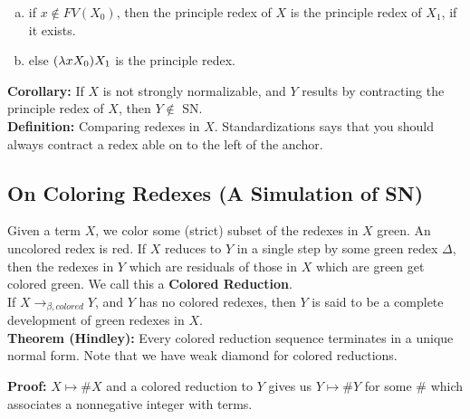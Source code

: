 \begin{enumerate}[a.]
  \item if $x \not\in FV(X_0)$, then the principle redex of $X$ is the principle redex of $X_1$, if it exists.
  \item else $(\lambda xX_0)X_1$ is the principle redex.
\end{enumerate}

\textbf{Corollary:} If $X$ is not strongly normalizable, and $Y$ results by contracting the principle redex of $X$, then $Y \not\in$ SN.\\

\textbf{Definition:} Comparing redexes in $X$. Standardizations says that you should always contract a redex able on to the left of the anchor.

\subsection{On Coloring Redexes (A Simulation of SN)}
Given a term $X$, we color some (strict) subset of the redexes in $X$ green. An uncolored redex is red. If $X$ reduces to $Y$ in a single step by some green redex $\Delta$, then the redexes in $Y$ which are residuals of those in $X$ which are green get colored green. We call this a \textbf{Colored Reduction}.\\

If $X \rightarrow_{\beta, colored} Y$, and $Y$ has no colored redexes, then $Y$ is said to be a complete development of green redexes in $X$.\\

\textbf{Theorem (Hindley):} Every colored reduction sequence terminates in a unique normal form. Note that we have weak diamond for colored reductions.
\begin{center}
\end{center}

\textbf{Proof:} $X \mapsto \# X$ and a colored reduction to $Y$ gives us $Y \mapsto \# Y$ for some $\#$ which associates a nonnegative integer with terms.